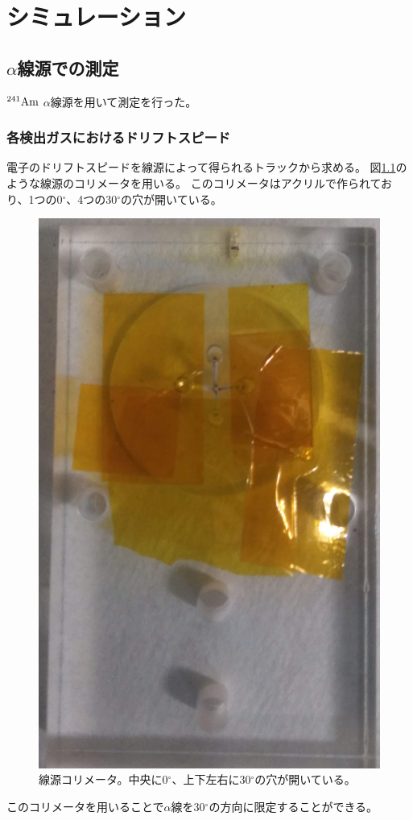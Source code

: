 \chapter{シミュレーション}
\label{chap::simulation}
\section{$\alpha$線源での測定}
${}^{241}{\rm Am}$ $\alpha$線源を用いて測定を行った。

\subsection{各検出ガスにおけるドリフトスピード}
電子のドリフトスピードを線源によって得られるトラックから求める。
図\ref{pic::collimator}のような線源のコリメータを用いる。
このコリメータはアクリルで作られており、1つの0${}^{\circ}$、4つの30${}^{\circ}$の穴が開いている。
\begin{figure}
  \centering
  \includegraphics[clip, height=0.7\columnwidth, angle=90]{pic/IMG_20191023_145443_trmd.jpg}
  \caption[線源コリメータ。]
          {線源コリメータ。中央に0${}^{\circ}$、上下左右に30${}^{\circ}$の穴が開いている。}
  \label{pic::collimator}  
\end{figure}
このコリメータを用いることで$\alpha$線を30${}^{\circ}$の方向に限定することができる。
